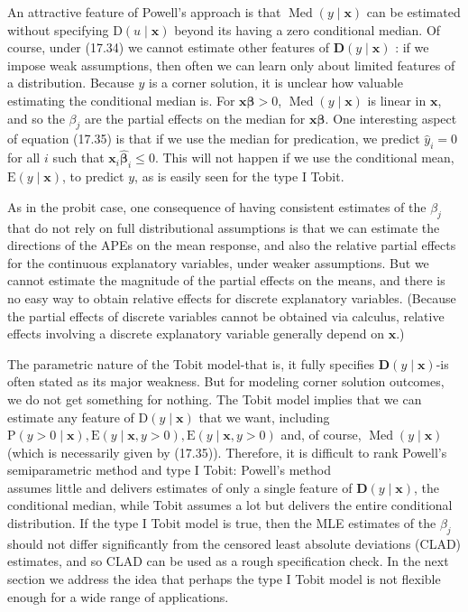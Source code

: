 \documentclass[10pt]{article}
\begin{document}
An attractive feature of Powell's approach is that $\operatorname{Med}(y \mid \mathbf{x})$ can be estimated without specifying $\mathrm{D}(u \mid \mathbf{x})$ beyond its having a zero conditional median. Of course, under (17.34) we cannot estimate other features of $\mathbf{D}(y \mid \mathbf{x})$ : if we impose weak assumptions, then often we can learn only about limited features of a distribution. Because $y$ is a corner solution, it is unclear how valuable estimating the conditional median is. For $\mathbf{x} \boldsymbol{\beta}>0$, $\operatorname{Med}(y \mid \mathbf{x})$ is linear in $\mathbf{x}$, and so the $\beta_{j}$ are the partial effects on the median for $\mathbf{x} \boldsymbol{\beta}$. One interesting aspect of equation (17.35) is that if we use the median for predication, we predict $\hat{y}_{i}=0$ for all $i$ such that $\mathbf{x}_{i} \hat{\boldsymbol{\beta}}_{i} \leq 0$. This will not happen if we use the conditional mean, $\mathrm{E}(y \mid \mathbf{x})$, to predict $y$, as is easily seen for the type I Tobit.

As in the probit case, one consequence of having consistent estimates of the $\beta_{j}$ that do not rely on full distributional assumptions is that we can estimate the directions of the APEs on the mean response, and also the relative partial effects for the continuous explanatory variables, under weaker assumptions. But we cannot estimate the magnitude of the partial effects on the means, and there is no easy way to obtain relative effects for discrete explanatory variables. (Because the partial effects of discrete variables cannot be obtained via calculus, relative effects involving a discrete explanatory variable generally depend on $\mathbf{x}$.)

The parametric nature of the Tobit model-that is, it fully specifies $\mathbf{D}(y \mid \mathbf{x})$-is often stated as its major weakness. But for modeling corner solution outcomes, we do not get something for nothing. The Tobit model implies that we can estimate any feature of $\mathrm{D}(y \mid \mathbf{x})$ that we want, including $\mathrm{P}(y>0 \mid \mathbf{x}), \mathrm{E}(y \mid \mathbf{x}, y>0), \mathrm{E}(y \mid \mathbf{x}, y>0)$ and, of course, $\operatorname{Med}(y \mid \mathbf{x})$ (which is necessarily given by (17.35)). Therefore, it is difficult to rank Powell's semiparametric method and type I Tobit: Powell's method\\
assumes little and delivers estimates of only a single feature of $\mathbf{D}(y \mid \mathbf{x})$, the conditional median, while Tobit assumes a lot but delivers the entire conditional distribution. If the type I Tobit model is true, then the MLE estimates of the $\beta_{j}$ should not differ significantly from the censored least absolute deviations (CLAD) estimates, and so CLAD can be used as a rough specification check. In the next section we address the idea that perhaps the type I Tobit model is not flexible enough for a wide range of applications.
\end{document}
